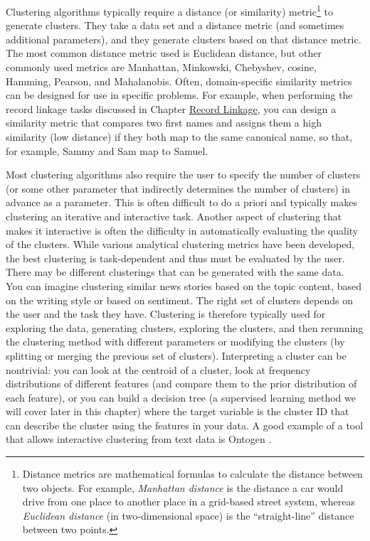 \documentclass[]{krantz}
\begin{document}
Clustering algorithms typically require a distance (or similarity)
metric\footnote{Distance metrics are mathematical formulas to calculate
  the distance between two objects. For example, \emph{Manhattan
  distance} is the distance a car would drive from one place to another
  place in a grid-based street system, whereas \emph{Euclidean distance}
  (in two-dimensional space) is the ``straight-line'' distance between
  two points.} to generate clusters. They take a data set and a distance
metric (and sometimes additional parameters), and they generate clusters
based on that distance metric. The most common distance metric used is
Euclidean distance, but other commonly used metrics are Manhattan,
Minkowski, Chebyshev, cosine, Hamming, Pearson, and Mahalanobis. Often,
domain-specific similarity metrics can be designed for use in specific
problems. For example, when performing the record linkage tasks
discussed in Chapter \protect\hyperlink{chap:link}{Record Linkage}, you
can design a similarity metric that compares two first names and assigns
them a high similarity (low distance) if they both map to the same
canonical name, so that, for example, Sammy and Sam map to Samuel.

Most clustering algorithms also require the user to specify the number
of clusters (or some other parameter that indirectly determines the
number of clusters) in advance as a parameter. This is often difficult
to do a priori and typically makes clustering an iterative and
interactive task. Another aspect of clustering that makes it interactive
is often the difficulty in automatically evaluating the quality of the
clusters. While various analytical clustering metrics have been
developed, the best clustering is task-dependent and thus must be
evaluated by the user. There may be different clusterings that can be
generated with the same data. You can imagine clustering similar news
stories based on the topic content, based on the writing style or based
on sentiment. The right set of clusters depends on the user and the task
they have. Clustering is therefore typically used for exploring the
data, generating clusters, exploring the clusters, and then rerunning
the clustering method with different parameters or modifying the
clusters (by splitting or merging the previous set of clusters).
Interpreting a cluster can be nontrivial: you can look at the centroid
of a cluster, look at frequency distributions of different features (and
compare them to the prior distribution of each feature), or you can
build a decision tree (a supervised learning method we will cover later
in this chapter) where the target variable is the cluster ID that can
describe the cluster using the features in your data. A good example of
a tool that allows interactive clustering from text data is Ontogen
\citep{Ontogen}.
\end{document}
